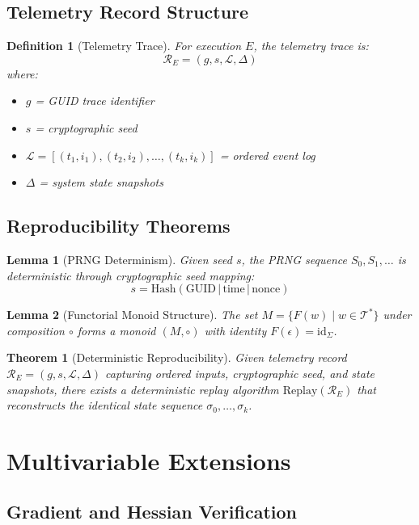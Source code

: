\documentclass[12pt,a4paper]{article}
\newtheorem{theorem}{Theorem}
\newtheorem{lemma}{Lemma}
\newtheorem{definition}{Definition}
\begin{document}
\subsection{Telemetry Record Structure}

\begin{definition}[Telemetry Trace]
For execution $E$, the telemetry trace is:
\[\mathcal{R}_E = (g, s, \mathcal{L}, \Delta)\]
where:
\begin{itemize}
\item $g$ = GUID trace identifier
\item $s$ = cryptographic seed
\item $\mathcal{L} = [(t_1,i_1), (t_2,i_2), \ldots, (t_k,i_k)]$ = ordered event log
\item $\Delta$ = system state snapshots
\end{itemize}
\end{definition}

\subsection{Reproducibility Theorems}

\begin{lemma}[PRNG Determinism]
Given seed $s$, the PRNG sequence $S_0, S_1, \ldots$ is deterministic through cryptographic seed mapping:
\[s = \text{Hash}(\text{GUID} \,|\, \text{time} \,|\, \text{nonce})\]
\end{lemma}

\begin{lemma}[Functorial Monoid Structure]
The set $M = \{F(w) \mid w \in \mathcal{T}^*\}$ under composition $\circ$ forms a monoid $(M, \circ)$ with identity $F(\epsilon) = \text{id}_\Sigma$.
\end{lemma}

\begin{theorem}[Deterministic Reproducibility]
Given telemetry record $\mathcal{R}_E = (g,s,\mathcal{L},\Delta)$ capturing ordered inputs, cryptographic seed, and state snapshots, there exists a deterministic replay algorithm $\text{Replay}(\mathcal{R}_E)$ that reconstructs the identical state sequence $\sigma_0, \ldots, \sigma_k$.
\end{theorem}

\section{Multivariable Extensions}

\subsection{Gradient and Hessian Verification}
\end{document}
